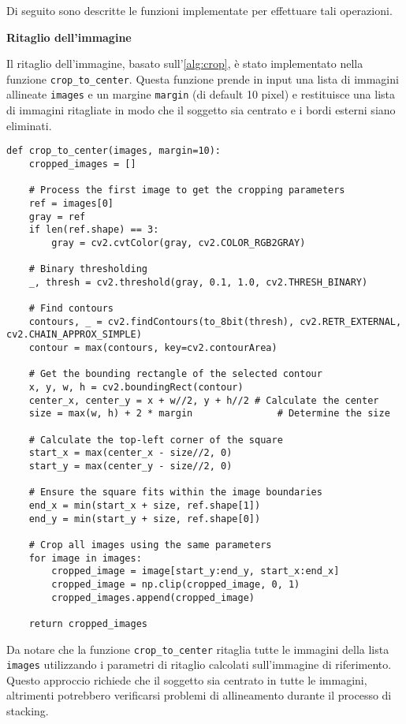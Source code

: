 Di seguito sono descritte le funzioni implementate per effettuare tali operazioni.

\textbf{Ritaglio dell'immagine}

Il ritaglio dell'immagine, basato sull'\cref{alg:crop}, è stato implementato nella funzione \texttt{crop\_to\_center}. Questa funzione prende in input una lista di immagini allineate \texttt{images} e un margine \texttt{margin} (di default 10 pixel) e restituisce una lista di immagini ritagliate in modo che il soggetto sia centrato e i bordi esterni siano eliminati.

\begin{lstlisting}[label={lst:crop}]
    def crop_to_center(images, margin=10):
    cropped_images = []

    # Process the first image to get the cropping parameters
    ref = images[0]
    gray = ref
    if len(ref.shape) == 3:
        gray = cv2.cvtColor(gray, cv2.COLOR_RGB2GRAY)

    # Binary thresholding
    _, thresh = cv2.threshold(gray, 0.1, 1.0, cv2.THRESH_BINARY)

    # Find contours
    contours, _ = cv2.findContours(to_8bit(thresh), cv2.RETR_EXTERNAL, cv2.CHAIN_APPROX_SIMPLE)
    contour = max(contours, key=cv2.contourArea)

    # Get the bounding rectangle of the selected contour
    x, y, w, h = cv2.boundingRect(contour)
    center_x, center_y = x + w//2, y + h//2 # Calculate the center
    size = max(w, h) + 2 * margin               # Determine the size

    # Calculate the top-left corner of the square
    start_x = max(center_x - size//2, 0)
    start_y = max(center_y - size//2, 0)

    # Ensure the square fits within the image boundaries
    end_x = min(start_x + size, ref.shape[1])
    end_y = min(start_y + size, ref.shape[0])

    # Crop all images using the same parameters
    for image in images:
        cropped_image = image[start_y:end_y, start_x:end_x]
        cropped_image = np.clip(cropped_image, 0, 1)
        cropped_images.append(cropped_image)

    return cropped_images
\end{lstlisting}

Da notare che la funzione \texttt{crop\_to\_center} ritaglia tutte le immagini della lista \texttt{images} utilizzando i parametri di ritaglio calcolati sull'immagine di riferimento. Questo approccio richiede che il soggetto sia centrato in tutte le immagini, altrimenti potrebbero verificarsi problemi di allineamento durante il processo di stacking.

